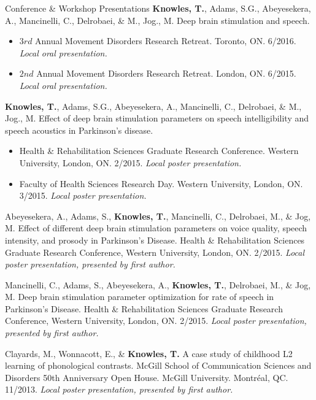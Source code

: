 \documentclass{resume} %
\begin{document}
\begin{rSection}{Conference \& Workshop Presentations}
	{\bf Knowles, T.}, Adams, S.G., Abeyesekera, A., Mancinelli, C., Delrobaei, \& M., Jog., M. Deep brain stimulation and speech.
	\begin{itemize}
				\renewcommand\labelitemi{$\cdot$}
		\item $3rd$ Annual Movement Disorders Research Retreat. Toronto, ON. 6/2016.  \emph{Local oral presentation.}
		\item $2nd$ Annual Movement Disorders Research Retreat. London, ON. 6/2015.  \emph{Local oral presentation.}
	\end{itemize}
	
	{\bf Knowles, T.}, Adams, S.G., Abeyesekera, A., Mancinelli, C., Delrobaei, \& M., Jog., M. Effect of deep brain stimulation parameters on speech intelligibility and speech acoustics in Parkinson's disease. 
	\begin{itemize}
				\renewcommand\labelitemi{$\cdot$}
		\item Health \& Rehabilitation Sciences Graduate Research Conference. Western University, London, ON.  2/2015.  \emph{Local poster presentation.}
		\item Faculty of Health Sciences Research Day. Western University, London, ON. 3/2015.  \emph{Local poster presentation.}
	\end{itemize}
	
	Abeyesekera, A., Adams, S., {\bf Knowles, T.}, Mancinelli, C., Delrobaei, M., \& Jog, M. Effect of different deep brain stimulation parameters on voice quality, speech intensity, and prosody in Parkinson's Disease. Health \& Rehabilitation Sciences Graduate Research Conference, Western University, London, ON. 2/2015.  \emph{Local poster presentation, presented by first author.}
	
	Mancinelli, C., Adams, S., Abeyesekera, A., {\bf Knowles, T.}, Delrobaei, M., \& Jog, M. Deep brain stimulation parameter optimization for rate of speech in Parkinson's Disease. Health \& Rehabilitation Sciences Graduate Research Conference, Western University, London, ON. 2/2015. \emph{Local poster presentation, presented by first author.}

	Clayards, M., Wonnacott, E., \& {\bf Knowles, T.} A case study of childhood L2 learning of phonological contrasts. McGill School of Communication Sciences and Disorders 50th Anniversary Open House. McGill University. Montr\'eal, QC. 11/2013. \emph{Local poster presentation, presented by first author.}

\end{rSection}
\end{document}
